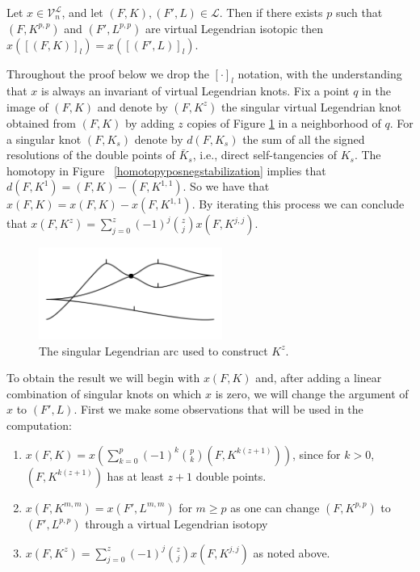 \begin{thm}\label{ppsameinvariant}
Let $x\in \mathcal{V}_n^\mathcal{L}$, and let $(F, K), (F', L) \in \mathcal{L}$.  Then if there exists $p$ such that  $(F, K^{p,p})$ and $(F', L^{p,p})$ are virtual Legendrian isotopic then $x([(F, K)]_l) = x([(F', L)]_l)$.
\end{thm}

\pp Throughout the proof below we drop the $[\cdot]_l$ notation, with the understanding that $x$ is always an invariant of virtual Legendrian knots. Fix a point $q$ in the image of $(F, K)$ and denote by $(F, K^z)$ the singular virtual Legendrian knot obtained from $(F, K)$ by adding $z$ copies of Figure \ref{DoublePoint.fig} in a neighborhood of $q$.  For a singular knot $(F, K_s)$ denote by $d(F,  K_s)$ the sum of all the signed resolutions of the double points of $\bar{K}_s$, i.e., direct self-tangencies of $K_s$.  The homotopy in Figure ~\ref{homotopyposnegstabilization} implies that $d(F, K^1) = (F, K) - (F, K^{1,1})$.  So we have that $x(F, K) = x(F, K) - x(F, K^{1,1})$.  By iterating this process we can conclude that $x(F, K^z) = \sum_{j=0}^{z}(-1)^j\binom{z}{j}x\left(F, K^{j,j}\right)$.

\begin{figure}[htbp]
	\centering
	\includegraphics[width=6cm]{DoublePoint}
	\caption{The singular Legendrian arc used to construct $K^z$.}
	\label{DoublePoint.fig}
\end{figure}

To obtain the result we will begin with $x(F,K)$ and, after adding a linear combination of singular knots on which $x$ is zero, we will change the argument of $x$ to $(F', L)$.  First we make some observations that will be used in the computation:
\begin{enumerate} 
\item $x(F, K) = x(\sum_{k=0}^p(-1)^k\binom{p}{k}(F, K^{k(z+1)}))$, since for $k>0$, $(F, K^{k(z+1)})$ has at least $z+1$ double points.  
\item $x(F, K^{m,m}) = x(F', L^{m,m})$ for $m\geq p$ as one can change $(F, K^{p,p})$ to $(F', L^{p,p})$ through a virtual Legendrian isotopy
\item $x(F, K^z) = \sum_{j=0}^{z}(-1)^j\binom{z}{j}x\left(F, K^{j,j}\right)$ as noted above.
\end{enumerate}

